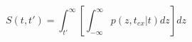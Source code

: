 \begin{equation}
S(t,t') = \int_{t'}^{\infty} \left[ \int_{-\infty}^\infty p(z,t_{ex}|t) dz\right] dz
\end{equation}